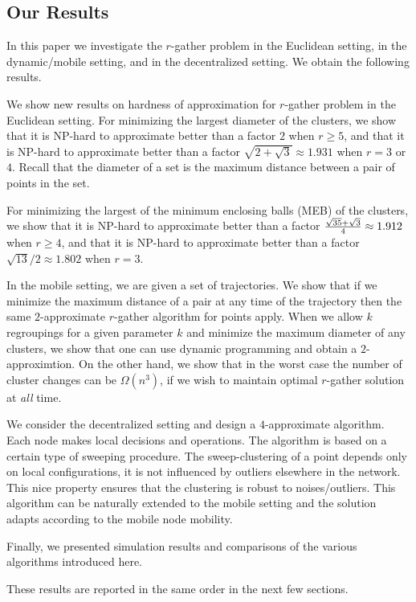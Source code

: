 

\subsection{Our Results}
In this paper we investigate the $r$-gather problem in the Euclidean setting, in the dynamic/mobile setting, and in the decentralized setting. We obtain the following results. 
\bitem

\item We show new results on hardness of approximation for $r$-gather problem in the Euclidean setting. For minimizing the largest diameter of the clusters, we show that it is NP-hard to approximate better than a factor $2$ when $r\geq5$, and that it is NP-hard to approximate better than a factor $\sqrt{2+\sqrt{3}} \approx 1.931$ when $r=3$ or $4$.  Recall that the diameter of a set is the maximum distance between a pair of points in the set.

For minimizing the largest of the minimum enclosing balls (MEB) of the clusters, we show that it is NP-hard to approximate better than a factor ${\sqrt{35}+\sqrt{3} \over 4} \approx 1.912$ when $r \geq 4$, and that it is NP-hard to approximate better than a factor $\sqrt{13}/2 \approx 1.802$ when $r=3$.

\item In the mobile setting, we are given a set of trajectories. We show that if we  minimize the maximum distance of a pair at any time of the trajectory then the same $2$-approximate $r$-gather algorithm for points apply. When we allow $k$ regroupings for a given parameter $k$ and minimize the maximum diameter of any clusters, we show that one can use dynamic programming and obtain a $2$-approximtion. On the other hand, we show that in the worst case the number of cluster changes can be $\Omega(n^3)$, if we wish to maintain optimal $r$-gather solution at \emph{all} time.

\item We consider the decentralized setting and design a $4$-approximate algorithm. Each node makes local decisions and operations. The algorithm is based on a certain type of sweeping procedure. The sweep-clustering of a point depends only on local configurations, it is not influenced by outliers elsewhere in the network. This nice property ensures that the clustering is robust to noises/outliers. This algorithm can be naturally extended to the mobile setting and the solution adapts according to the mobile node mobility. 

\item Finally, we presented simulation results and comparisons of the various algorithms introduced here. 

\eitem

These results are reported in the same order in the next few sections. 
